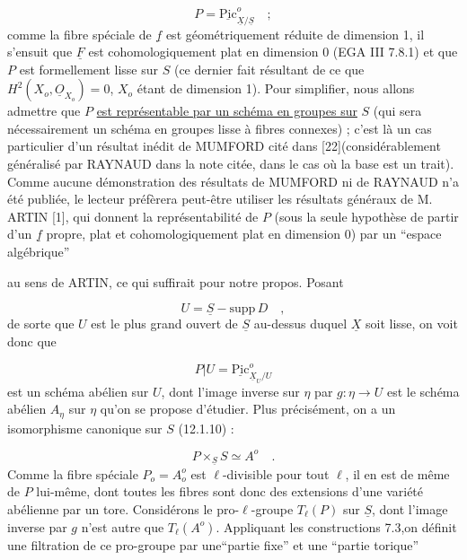 \begin{equation}\tag{12.8.3}
P = \underline{\mathrm{Pic}}^{o}_{\underline{X}/\underline{S}} \quad ;
\end{equation}
comme la fibre spéciale de $\underline{f}$ est géométriquement réduite de dimension 1, il s'ensuit que $\underline{F}$ est cohomologiquement plat en dimension 0 (EGA III 7.8.1) et que $P$ est formellement lisse sur $S$ (ce dernier fait résultant de ce que $H^2(X_o,\underline{O}_{X_o}) = 0$, $X_o$ étant de dimension 1). Pour simplifier, nous allons admettre que $P$ \underline{est représentable par un schéma en groupes sur} $S$ (qui sera nécessairement un schéma en groupes lisse à fibres connexes) ; c'est là un cas particulier d'un résultat inédit de MUMFORD cité dans [22](considérablement généralisé par RAYNAUD dans la note citée, dans le cas où la base est un trait). Comme aucune démonstration des résultats de MUMFORD ni de RAYNAUD n'a été publiée, le lecteur préfèrera peut-être utiliser les résultats généraux de M. ARTIN [1], qui donnent la représentabilité de $P$ (sous la seule hypothèse de partir d'un $\underline{f}$ propre, plat et cohomologiquement plat en dimension 0) par un ``espace algébrique''



au sens de ARTIN, ce qui suffirait pour notre propos. Posant

\begin{equation}\tag{12.8.4}
U = \underline{S} - \mathrm{supp}\, D \quad ,
\end{equation}
de sorte que $U$ est le plus grand ouvert de $\underline{S}$ au-dessus duquel $\underline{X}$ soit lisse, on voit donc que

\begin{equation*}
P\vert U = \underline{\mathrm{Pic}}^{o}_{\underline{X}_U/U}
\end{equation*}
est un schéma abélien sur $U$, dont l'image inverse sur $\eta$ par $g : \eta \longrightarrow U$ est le schéma abélien $A_\eta$ sur $\eta$ qu'on se propose d'étudier. Plus précisément, on a un isomorphisme canonique sur $S$ (12.1.10) :

\begin{equation}\tag{12.8.5}
P \times_{\underline{S}} S \simeq A^{o} \quad .
\end{equation}
Comme la fibre spéciale $P_o = A_o^{o}$ est $\ell$-divisible pour tout $\ell$, il en est de même de $P$ lui-même, dont toutes les fibres sont donc des extensions d'une variété abélienne par un tore. Considérons le pro-$\ell$-groupe $T_\ell(P)$ sur $\underline{S}$, dont l'image inverse par $g$ n'est autre que $T_\ell(A^{o})$. Appliquant les constructions 7.3,on définit une filtration de ce pro-groupe par une``partie fixe'' et une ``partie torique''

